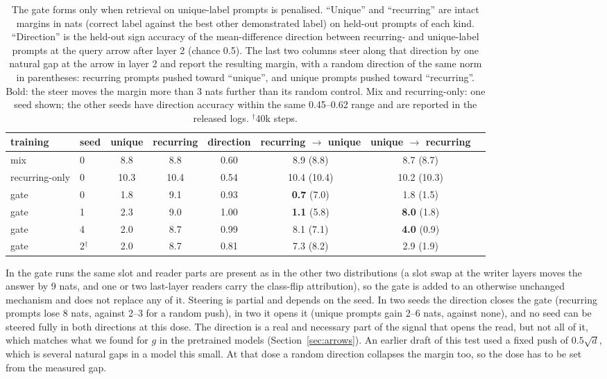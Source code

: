 \documentclass{article}
\begin{document}
\begin{table}[h]\centering\small
\begin{tabular}{llcccccc}
\toprule
training & seed & unique & recurring & direction & recurring $\to$ unique & unique $\to$ recurring \\
\midrule
mix & 0 & 8.8 & 8.8 & 0.60 & 8.9 (8.8) & 8.7 (8.7) \\
recurring-only & 0 & 10.3 & 10.4 & 0.54 & 10.4 (10.4) & 10.2 (10.3) \\
gate & 0 & 1.8 & 9.1 & 0.93 & \textbf{0.7} (7.0) & 1.8 (1.5) \\
gate & 1 & 2.3 & 9.0 & 1.00 & \textbf{1.1} (5.8) & \textbf{8.0} (1.8) \\
gate & 4 & 2.0 & 8.7 & 0.99 & 8.1 (7.1) & \textbf{4.0} (0.9) \\
gate & 2$^{\dagger}$ & 2.0 & 8.7 & 0.81 & 7.3 (8.2) & 2.9 (1.9) \\
\bottomrule
\end{tabular}
\caption{The gate forms only when retrieval on unique-label prompts is penalised. ``Unique'' and ``recurring'' are intact margins in nats (correct label against the best other demonstrated label) on held-out prompts of each kind. ``Direction'' is the held-out sign accuracy of the mean-difference direction between recurring- and unique-label prompts at the query arrow after layer 2 (chance 0.5). The last two columns steer along that direction by one natural gap at the arrow in layer 2 and report the resulting margin, with a random direction of the same norm in parentheses: recurring prompts pushed toward ``unique'', and unique prompts pushed toward ``recurring''. Bold: the steer moves the margin more than 3 nats further than its random control. Mix and recurring-only: one seed shown; the other seeds have direction accuracy within the same 0.45--0.62 range and are reported in the released logs. $^{\dagger}$40k steps.}
\label{tab:toygate}
\end{table}

In the gate runs the same slot and reader parts are present as in the other two distributions (a slot swap at the writer layers moves the answer by 9 nats, and one or two last-layer readers carry the class-flip attribution), so the gate is added to an otherwise unchanged mechanism and does not replace any of it. Steering is partial and depends on the seed. In two seeds the direction closes the gate (recurring prompts lose 8 nats, against 2--3 for a random push), in two it opens it (unique prompts gain 2--6 nats, against none), and no seed can be steered fully in both directions at this dose. The direction is a real and necessary part of the signal that opens the read, but not all of it, which matches what we found for $g$ in the pretrained models (Section~\ref{sec:arrows}). An earlier draft of this test used a fixed push of $0.5\sqrt{d}$, which is several natural gaps in a model this small. At that dose a random direction collapses the margin too, so the dose has to be set from the measured gap.
\end{document}

